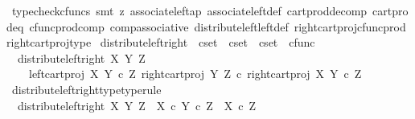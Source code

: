 \begin{isabellebody}
\ {\isacharparenleft}{\kern0pt}typecheck{\isacharunderscore}{\kern0pt}cfuncs{\isacharcomma}{\kern0pt}\ smt\ {\isacharparenleft}{\kern0pt}z{}{\isacharparenright}{\kern0pt}\ associate{\isacharunderscore}{\kern0pt}left{\isacharunderscore}{\kern0pt}ap\ associate{\isacharunderscore}{\kern0pt}left{\isacharunderscore}{\kern0pt}def\ cart{\isacharunderscore}{\kern0pt}prod{\isacharunderscore}{\kern0pt}decomp\ cart{\isacharunderscore}{\kern0pt}prod{\isacharunderscore}{\kern0pt}eq{}\ cfunc{\isacharunderscore}{\kern0pt}prod{\isacharunderscore}{\kern0pt}comp\ comp{\isacharunderscore}{\kern0pt}associative{}\ distribute{\isacharunderscore}{\kern0pt}left{\isacharunderscore}{\kern0pt}left{\isacharunderscore}{\kern0pt}def\ right{\isacharunderscore}{\kern0pt}cart{\isacharunderscore}{\kern0pt}proj{\isacharunderscore}{\kern0pt}cfunc{\isacharunderscore}{\kern0pt}prod\ right{\isacharunderscore}{\kern0pt}cart{\isacharunderscore}{\kern0pt}proj{\isacharunderscore}{\kern0pt}type{\isacharparenright}{\kern0pt}%
\endisatagproof
{\isafoldproof}%
%
\isadelimproof
\isanewline
%
\endisadelimproof
\isanewline
{}\isamarkupfalse%
\ distribute{\isacharunderscore}{\kern0pt}left{\isacharunderscore}{\kern0pt}right\ {\isacharcolon}{\kern0pt}{\isacharcolon}{\kern0pt}\ {\isachardoublequoteopen}cset\ {\isasymRightarrow}\ cset\ {\isasymRightarrow}\ cset\ {\isasymRightarrow}\ cfunc{\isachardoublequoteclose}\ \isanewline
\ \ {\isachardoublequoteopen}distribute{\isacharunderscore}{\kern0pt}left{\isacharunderscore}{\kern0pt}right\ X\ Y\ Z\ {\isacharequal}{\kern0pt}\ \isanewline
\ \ \ \ {\isasymlangle}left{\isacharunderscore}{\kern0pt}cart{\isacharunderscore}{\kern0pt}proj\ X\ {\isacharparenleft}{\kern0pt}Y\ {\isasymtimes}\isactrlsub c\ Z{\isacharparenright}{\kern0pt}{\isacharcomma}{\kern0pt}\ right{\isacharunderscore}{\kern0pt}cart{\isacharunderscore}{\kern0pt}proj\ Y\ Z\ {\isasymcirc}\isactrlsub c\ right{\isacharunderscore}{\kern0pt}cart{\isacharunderscore}{\kern0pt}proj\ X\ {\isacharparenleft}{\kern0pt}Y\ {\isasymtimes}\isactrlsub c\ Z{\isacharparenright}{\kern0pt}{\isasymrangle}{\isachardoublequoteclose}\isanewline
\isanewline
{}\isamarkupfalse%
\ distribute{\isacharunderscore}{\kern0pt}left{\isacharunderscore}{\kern0pt}right{\isacharunderscore}{\kern0pt}type{\isacharbrackleft}{\kern0pt}type{\isacharunderscore}{\kern0pt}rule{\isacharbrackright}{\kern0pt}{\isacharcolon}{\kern0pt}\isanewline
\ \ {\isachardoublequoteopen}distribute{\isacharunderscore}{\kern0pt}left{\isacharunderscore}{\kern0pt}right\ X\ Y\ Z\ {\isacharcolon}{\kern0pt}\ X\ {\isasymtimes}\isactrlsub c\ {\isacharparenleft}{\kern0pt}Y\ {\isasymtimes}\isactrlsub c\ Z{\isacharparenright}{\kern0pt}\ {\isasymrightarrow}\ X\ {\isasymtimes}\isactrlsub c\ Z{\isachardoublequoteclose}\isanewline

\end{isabellebody}
